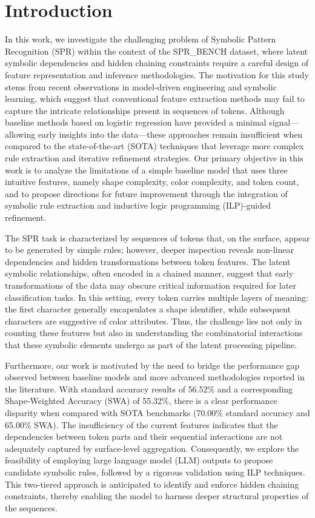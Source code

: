 \documentclass{article}
\begin{document}
\section{Introduction}
In this work, we investigate the challenging problem of Symbolic Pattern Recognition (SPR) within the context of the SPR\_BENCH dataset, where latent symbolic dependencies and hidden chaining constraints require a careful design of feature representation and inference methodologies. The motivation for this study stems from recent observations in model-driven engineering and symbolic learning, which suggest that conventional feature extraction methods may fail to capture the intricate relationships present in sequences of tokens. Although baseline methods based on logistic regression have provided a minimal signal—allowing early insights into the data—these approaches remain insufficient when compared to the state-of-the-art (SOTA) techniques that leverage more complex rule extraction and iterative refinement strategies. Our primary objective in this work is to analyze the limitations of a simple baseline model that uses three intuitive features, namely shape complexity, color complexity, and token count, and to propose directions for future improvement through the integration of symbolic rule extraction and inductive logic programming (ILP)-guided refinement.

The SPR task is characterized by sequences of tokens that, on the surface, appear to be generated by simple rules; however, deeper inspection reveals non-linear dependencies and hidden transformations between token features. The latent symbolic relationships, often encoded in a chained manner, suggest that early transformations of the data may obscure critical information required for later classification tasks. In this setting, every token carries multiple layers of meaning: the first character generally encapsulates a shape identifier, while subsequent characters are suggestive of color attributes. Thus, the challenge lies not only in counting these features but also in understanding the combinatorial interactions that these symbolic elements undergo as part of the latent processing pipeline.

Furthermore, our work is motivated by the need to bridge the performance gap observed between baseline models and more advanced methodologies reported in the literature. With standard accuracy results of 56.52\% and a corresponding Shape-Weighted Accuracy (SWA) of 55.32\%, there is a clear performance disparity when compared with SOTA benchmarks (70.00\% standard accuracy and 65.00\% SWA). The insufficiency of the current features indicates that the dependencies between token parts and their sequential interactions are not adequately captured by surface-level aggregation. Consequently, we explore the feasibility of employing large language model (LLM) outputs to propose candidate symbolic rules, followed by a rigorous validation using ILP techniques. This two-tiered approach is anticipated to identify and enforce hidden chaining constraints, thereby enabling the model to harness deeper structural properties of the sequences.
\end{document}

